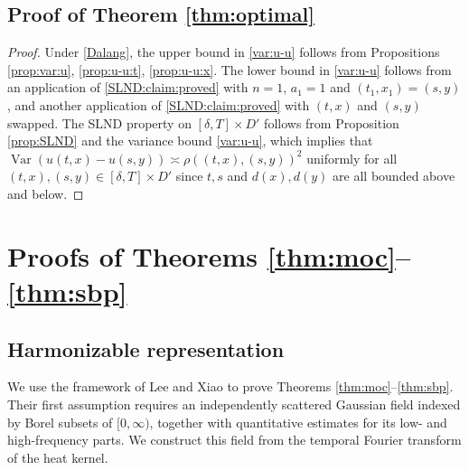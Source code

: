 \documentclass[reqno]{amsart}
\DeclareMathOperator{\Var}{Var}
\newcommand{\1}{\mathbf 1}
\numberwithin{equation}{section}
\theoremstyle{definition}
\begin{document}

\subsection{Proof of Theorem \ref{thm:optimal}}

\begin{proof}
Under \eqref{Dalang}, the upper bound in \eqref{var:u-u} follows from Propositions \ref{prop:var:u}, \ref{prop:u-u:t}, \ref{prop:u-u:x}.
The lower bound in \eqref{var:u-u} follows from an application of \eqref{SLND:claim:proved} with $n=1$, $a_1=1$ and $(t_1,x_1)=(s,y)$, and another application of \eqref{SLND:claim:proved} with $(t,x)$ and $(s,y)$ swapped.
The SLND property on $[\delta,T]\times D'$ follows from Proposition \ref{prop:SLND} and the variance bound \eqref{var:u-u}, which implies that $\Var(u(t,x)-u(s,y)) \asymp \rho((t,x),(s,y))^2$ uniformly for all $(t,x),(s,y)\in [\delta,T]\times D'$ since $t,s$ and $d(x),d(y)$ are all bounded above and below.
\end{proof}


\section{Proofs of Theorems \ref{thm:moc}--\ref{thm:sbp}}\label{s:proofs}



\subsection{Harmonizable representation}

We use the framework of Lee and Xiao \cite{LX23} to prove Theorems \ref{thm:moc}--\ref{thm:sbp}. Their first assumption
requires an independently scattered Gaussian field indexed by Borel subsets
of \([0,\infty)\), together with quantitative estimates for its low- and
high-frequency parts. We construct this field from the temporal Fourier
transform of the heat kernel.
\end{document}
